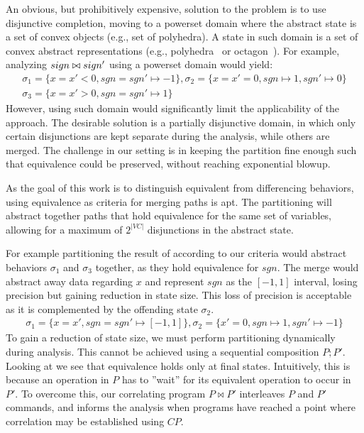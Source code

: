 An obvious, but prohibitively expensive, solution to the problem is to use disjunctive completion, moving to a powerset domain where the abstract state is a set of convex objects (e.g., set of polyhedra).
A state in such domain is a set of convex abstract representations (e.g., polyhedra~\cite{CousotHalbwachs78} or octagon~\cite{Mine2006}). For example, analyzing $sign \bowtie sign'$ using a powerset domain would yield:
{\footnotesize
\[
\begin{array}{c}
\sigma_1 = \{x = x' < 0, sgn = sgn' \mapsto -1\} , 
\sigma_2 = \{x = x' = 0, sgn \mapsto 1, sgn' \mapsto 0\}\\
\sigma_3 = \{x = x' > 0, sgn = sgn' \mapsto 1\}
\end{array}
\]
}
However, using such domain would significantly limit the applicability of the approach. The desirable solution is a partially disjunctive domain, in which only certain disjunctions are kept separate during the analysis, while others are merged. The challenge in our setting is in keeping the partition fine enough such that equivalence could be preserved, without reaching exponential blowup.

 As the goal of this work is to distinguish equivalent from differencing behaviors, using equivalence as criteria for merging paths is apt. The partitioning will abstract together paths that hold equivalence for the same set of variables, allowing for a maximum of $2^{|VC|}$ disjunctions in the abstract state.

For example partitioning the result of  according to our criteria would abstract behaviors $\sigma_1$ and $\sigma_3$ together, as they hold equivalence for $sgn$. The merge would abstract away data regarding $x$ and represent $sgn$ as the $[-1,1]$ interval, losing precision but gaining reduction in state size. This loss of precision is acceptable as it is complemented by the offending state $\sigma_2$.
{\footnotesize
\[
\begin{array}{c}
\sigma_1 = \{x = x', sgn = sgn' \mapsto [-1,1]\} , 
\sigma_2 = \{x' = 0, sgn \mapsto 1, sgn' \mapsto -1\}
\end{array}
\]
}
To gain a reduction of state size, we must perform partitioning dynamically during analysis. This cannot be achieved using a sequential composition $P;P'$. Looking at  we see that equivalence holds only at final states. Intuitively, this is because an operation in $P$ has to ''wait'' for its equivalent operation to occur in $P'$. To overcome this, our correlating program $P \bowtie P'$ interleaves $P$ and $P'$ commands, and informs the analysis when programs have reached a point where correlation may be established using $CP$.


